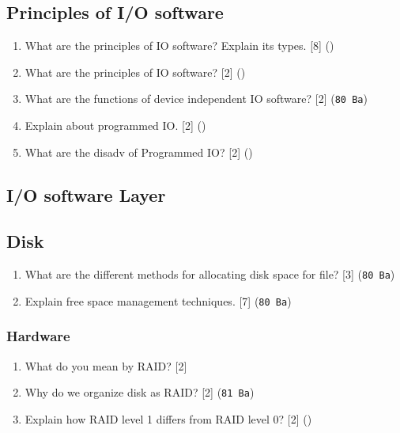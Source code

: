 \documentclass[12pt]{article}
\begin{document}
	\subsection{Principles of I/O software}
		\begin{enumerate}
			\item What are the principles of IO software? Explain its types. \hfill [8] ()

			\item What are the principles of IO software? \hfill [2] ()

			\item What are the functions of device independent IO software? \hfill [2] (\texttt{80 Ba})

			\item Explain about programmed IO. \hfill [2] ()

			\item What are the disadv of Programmed IO? \hfill [2] ()
		\end{enumerate}

	\subsection{I/O software Layer}
	\subsection{Disk}
		\begin{enumerate}
			\item What are the different methods for allocating disk space for file? \hfill [3] (\texttt{80 Ba})

			\item Explain free space management techniques. \hfill [7] (\texttt{80 Ba})
		\end{enumerate}
		\subsubsection{Hardware}
			\begin{enumerate}
				\item What do you mean by RAID? \hfill [2] 
				
				\item Why do we organize disk as RAID? \hfill [2] (\texttt{81 Ba})

				\item Explain how RAID level 1 differs from RAID level 0? \hfill [2] ()
			\end{enumerate}
\end{document}
